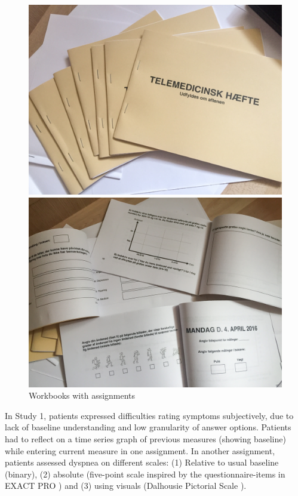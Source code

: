 \begin{figure}[!htb]
 \centering
 \begin{minipage}[b]{0.23\textwidth}
   \includegraphics[width=\textwidth]{img/workbook}
 \end{minipage}
 \hfill
 \begin{minipage}[b]{0.23\textwidth}
   \includegraphics[width=\textwidth]{img/workbook2}
 \end{minipage}
  \caption{Workbooks with assignments}\label{fig:workbook}
\end{figure}


In Study 1, patients expressed difficulties rating symptoms subjectively, due to lack of baseline understanding and low granularity of answer options. Patients had to reflect on a time series graph of previous measures (showing baseline) while entering current measure in one assignment. In another assignment, patients assessed dyspnea on different scales: (1) Relative to usual baseline (binary), (2) absolute (five-point scale inspired by the questionnaire-items in EXACT PRO \cite{exact}) and (3) using visuals (Dalhousie Pictorial Scale \cite{dalhousie}). 

